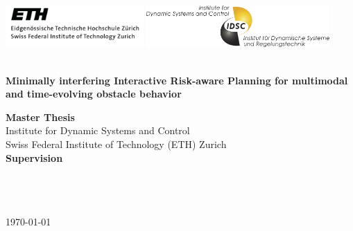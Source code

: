\begin{titlepage}

\pagestyle{empty}
\begin{center}

\includegraphics[height=1.6cm]{logos/eth_logo}
\hfill
\includegraphics[height=1.6cm]{logos/idsc_logo}

\vspace*{2cm}
{\large \theauthor}
\vspace{2.5cm}

\begin{minipage}{15cm}
\centering
\bfseries \Huge {\thetitle} 
\\\vspace*{1cm}\Large {Minimally interfering Interactive Risk-aware Planning for multimodal and time-evolving obstacle behavior}
\end{minipage}
\vspace*{4cm}


{\large \textbf{Master Thesis}} \\[3ex]
Institute for Dynamic Systems and Control\\
Swiss Federal Institute of Technology (ETH) Zurich\\

\vspace{2cm}
\textbf{Supervision} \\[1.5ex]
\phdA \\
\phdB \\ 
\supervisorstanford \\ 
\supervisoreth

\vfill
\today

\end{center}

\cleardoublepage %
\end{titlepage}
